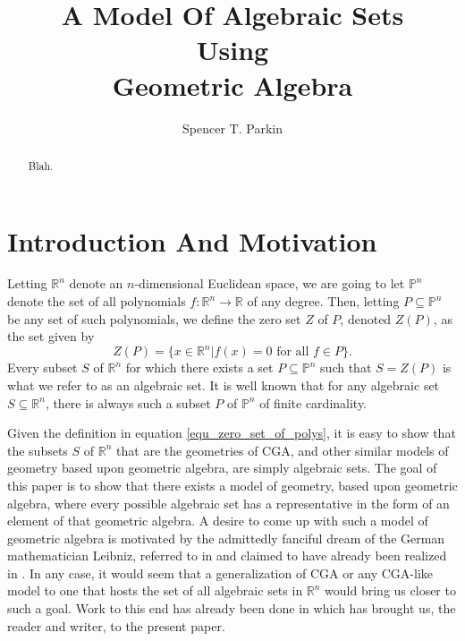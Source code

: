 \documentclass{birkjour}
\theoremstyle{definition}
\theoremstyle{remark}
\numberwithin{equation}{section}
\newcommand{\R}{\mathbb{R}}
\newcommand{\Poly}{\mathbb{P}}
\begin{document}
\title{A Model Of Algebraic Sets\\Using\\Geometric Algebra}

\author{Spencer T. Parkin}





\begin{abstract}
Blah.
\end{abstract}

\maketitle

\section{Introduction And Motivation}

Letting $\R^n$ denote an $n$-dimensional Euclidean space, we are
going to let $\Poly^n$ denote the set of all polynomials $f:\R^n\to\R$
of any degree.  Then, letting $P\subseteq\Poly^n$ be any set of such
polynomials, we define the zero set $Z$ of $P$, denoted $Z(P)$,
as the set given by
\begin{equation}\label{equ_zero_set_of_polys}
Z(P) = \{x\in\R^n|\mbox{$f(x)=0$ for all $f\in P$}\}.
\end{equation}
Every subset $S$ of $\R^n$ for which there exists a set $P\subseteq\Poly^n$
such that $S=Z(P)$ is what we refer to as an algebraic set.  It is well known
that for any algebraic set $S\subseteq\R^n$, there is always such a subset $P$
of $\Poly^n$ of finite cardinality.

Given the definition in equation \eqref{equ_zero_set_of_polys}, it is easy to show that
the subsets $S$ of $\R^n$ that are the geometries of
CGA, and other similar models of geometry based upon geometric algebra, are simply algebraic sets.
The goal of this paper is to show that there exists a model of geometry, based upon geometric algebra,
where every possible algebraic set has a representative in the form of an element of that geometric algebra.
A desire to come up with such a model of geometric algebra is motivated by the admittedly fanciful
dream of the German mathematician Leibniz, referred to in \cite{} and claimed to
have already been realized in \cite{}.  In any case, it would seem that a generalization
of CGA or any CGA-like model to one that hosts the set of all algebraic sets in $\R^n$ would bring
us closer to such a goal.  Work to this end has already been done in \cite{Parkin13a,Parkin13b} which
has brought us, the reader and writer, to the present paper.
\end{document}
